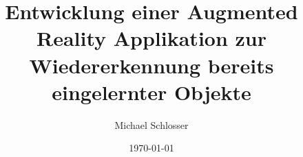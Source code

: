 \documentclass[oneside]{ausarbeitung}
\begin{document}


\Projektbericht

\Informatik

\title{Entwicklung einer Augmented Reality Applikation zur Wiedererkennung bereits eingelernter Objekte}

\author{Michael Schlosser}


\examinerIsAProfessorfalse %

\date{\today}



\maketitle
\cleardoublepage

\setcounter{page}{1}


\makeaffirmation
\cleardoublepage
\end{document}
